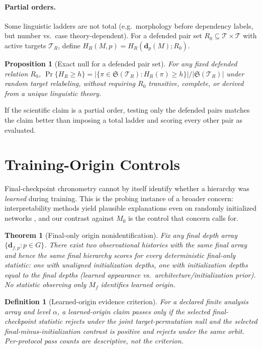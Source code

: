 \documentclass[11pt]{article}
\newtheorem{theorem}{Theorem}
\newtheorem{proposition}{Proposition}
\newtheorem{definition}{Definition}
\begin{document}
\paragraph{Partial orders.} Some linguistic ladders are not total (e.g.\ morphology before dependency labels, but number vs.\ case theory-dependent). For a defended pair set $R_0\subseteq\mathcal{T}\times\mathcal{T}$ with active targets $\mathcal{T}_R$, define $H_R(M,p)=H_R(\mathbf{d}_p(M);R_0)$.

\begin{proposition}[Exact null for a defended pair set]
\label{prop:partialnull}
For any fixed defended relation $R_0$, $\Pr\{H_R\ge h\}=|\{\pi\in\mathfrak{S}(\mathcal{T}_R):H_R(\pi)\ge h\}|/|\mathfrak{S}(\mathcal{T}_R)|$ under random target relabeling, without requiring $R_0$ transitive, complete, or derived from a unique linguistic theory.
\end{proposition}

If the scientific claim is a partial order, testing only the defended pairs matches the claim better than imposing a total ladder and scoring every other pair as evaluated.

\section{Training-Origin Controls}
\label{sec:origin}

Final-checkpoint chronometry cannot by itself identify whether a hierarchy was \emph{learned} during training. This is the probing instance of a broader concern: interpretability methods yield plausible explanations even on randomly initialized networks \citep{meloux2025deadsalmons}, and our contrast against $M_0$ is the control that concern calls for.

\begin{theorem}[Final-only origin nonidentification]
\label{thm:finalonly}
Fix any final depth array $\{\mathbf{d}_{f,p}:p\in G\}$. There exist two observational histories with the same final array and hence the same final hierarchy scores for every deterministic final-only statistic: one with unaligned initialization depths, one with initialization depths equal to the final depths (learned appearance vs.\ architecture/initialization prior). No statistic observing only $M_f$ identifies learned origin.
\end{theorem}

\begin{definition}[Learned-origin evidence criterion]
\label{def:criterion}
For a declared finite analysis array and level $\alpha$, a learned-origin claim passes only if the selected final-checkpoint statistic rejects under the joint target-permutation null \emph{and} the selected final-minus-initialization contrast is positive and rejects under the same orbit. Per-protocol pass counts are descriptive, not the criterion.
\end{definition}
\end{document}
